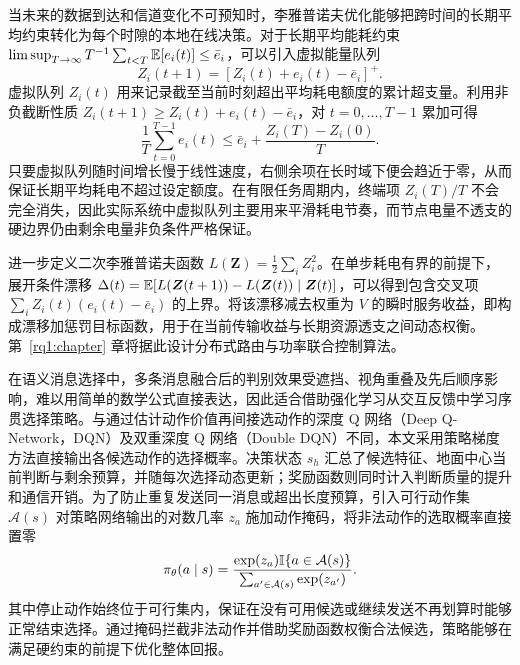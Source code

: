 当未来的数据到达和信道变化不可预知时，李雅普诺夫优化能够把跨时间的长期平均约束转化为每个时隙的本地在线决策\cite{neely2010stochastic}。对于长期平均能耗约束 $\limsup_{T\rightarrow\infty}T^{-1}\sum_{t<T}\mathbb{E}[e_i(t)]\le\bar e_i$，可以引入虚拟能量队列
\begin{equation}
Z_i(t+1)=\left[Z_i(t)+e_i(t)-\bar e_i\right]^+.
\label{eq:base:virtual-queue}
\end{equation}
虚拟队列 $Z_i(t)$ 用来记录截至当前时刻超出平均耗电额度的累计超支量。利用非负截断性质 $Z_i(t+1)\ge Z_i(t)+e_i(t)-\bar e_i$，对 $t=0,\ldots,T-1$ 累加可得
\begin{equation}
\frac{1}{T}\sum_{t=0}^{T-1}e_i(t)
\le \bar e_i+\frac{Z_i(T)-Z_i(0)}{T}.
\label{eq:base:finite-budget}
\end{equation}
只要虚拟队列随时间增长慢于线性速度，右侧余项在长时域下便会趋近于零，从而保证长期平均耗电不超过设定额度。在有限任务周期内，终端项 $Z_i(T)/T$ 不会完全消失，因此实际系统中虚拟队列主要用来平滑耗电节奏，而节点电量不透支的硬边界仍由剩余电量非负条件严格保证。

进一步定义二次李雅普诺夫函数 $L(\bm Z)=\frac12\sum_iZ_i^2$。在单步耗电有界的前提下，展开条件漂移 $\Delta(t)=\mathbb{E}[L(\bm Z(t+1))-L(\bm Z(t))\mid\bm Z(t)]$，可以得到包含交叉项 $\sum_iZ_i(t)(e_i(t)-\bar e_i)$ 的上界。将该漂移减去权重为 $V$ 的瞬时服务收益，即构成漂移加惩罚目标函数，用于在当前传输收益与长期资源透支之间动态权衡。第~\ref{rq1:chapter} 章将据此设计分布式路由与功率联合控制算法。

在语义消息选择中，多条消息融合后的判别效果受遮挡、视角重叠及先后顺序影响，难以用简单的数学公式直接表达，因此适合借助强化学习从交互反馈中学习序贯选择策略\cite{sutton2018rl}。与通过估计动作价值再间接选动作的深度 Q 网络（Deep Q-Network，DQN）及双重深度 Q 网络（Double DQN）不同\cite{mnih2015dqn,vanhasselt2016double}，本文采用策略梯度方法直接输出各候选动作的选择概率。决策状态 $s_h$ 汇总了候选特征、地面中心当前判断与剩余预算，并随每次选择动态更新；奖励函数则同时计入判断质量的提升和通信开销。为了防止重复发送同一消息或超出长度预算，引入可行动作集 $\mathcal A(s)$ 对策略网络输出的对数几率 $z_a$ 施加动作掩码，将非法动作的选取概率直接置零
\begin{equation}
\pi_\theta(a\mid s)=
\frac{\exp(z_a)\mathbb{I}\{a\in\mathcal A(s)\}}
{\sum_{a'\in\mathcal A(s)}\exp(z_{a'})}.
\label{eq:base:masked-policy}
\end{equation}
其中停止动作始终位于可行集内，保证在没有可用候选或继续发送不再划算时能够正常结束选择。通过掩码拦截非法动作并借助奖励函数权衡合法候选，策略能够在满足硬约束的前提下优化整体回报。

